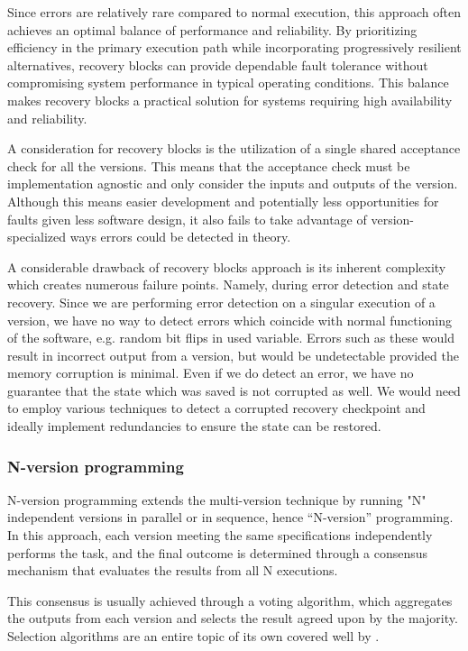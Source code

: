 \documentclass[12pt, letterpaper]{article}
\begin{document}
Since errors are relatively rare compared to normal execution, this approach often achieves an optimal balance of performance and reliability. By prioritizing efficiency in the primary execution path while incorporating progressively resilient alternatives, recovery blocks can provide dependable fault tolerance without compromising system performance in typical operating conditions. This balance makes recovery blocks a practical solution for systems requiring high availability and reliability.

A consideration for recovery blocks is the utilization of a single shared acceptance check for all the versions. This means that the acceptance check must be implementation agnostic and only consider the inputs and outputs of the version. Although this means easier development and potentially less opportunities for faults given less software design, it also fails to take advantage of version-specialized ways errors could be detected in theory.

A considerable drawback of recovery blocks approach is its inherent complexity which creates numerous failure points. Namely, during error detection and state recovery. Since we are performing error detection on a singular execution of a version, we have no way to detect errors which coincide with normal functioning of the software, e.g. random bit flips in used variable. Errors such as these would result in incorrect output from a version, but would be undetectable provided the memory corruption is minimal. Even if we do detect an error, we have no guarantee that the state which was saved is not corrupted as well. We would need to employ various techniques to detect a corrupted recovery checkpoint and ideally implement redundancies to ensure the state can be restored.

\subsubsection{N-version programming}

N-version programming extends the multi-version technique by running "N" independent versions in parallel or in sequence, hence “N-version” programming. In this approach, each version meeting the same specifications independently performs the task, and the final outcome is determined through a consensus mechanism that evaluates the results from all N executions.

This consensus is usually achieved through a voting algorithm, which aggregates the outputs from each version and selects the result agreed upon by the majority. Selection algorithms are an entire topic of its own covered well by \cite{Aljarbouh_2021}.
\end{document}
